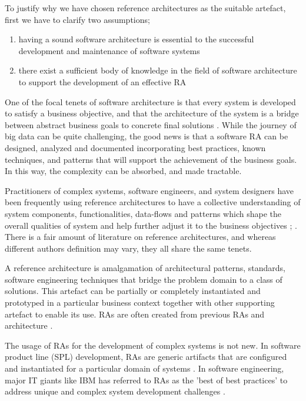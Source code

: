 \documentclass[review]{elsarticle}
\begin{document}
To justify why we have chosen reference architectures as the suitable artefact, first we have to clarify two assumptions; 

\begin{enumerate}
    \item having a sound software architecture is essential to the successful development and maintenance of software systems
    \item there exist a sufficient body of knowledge in the field of software architecture to support the development of an effective RA 
\end{enumerate}

One of the focal tenets of software architecture is that every system is developed to satisfy a business objective, and that the architecture of the system is a bridge between abstract business goals to concrete final solutions \cite{SoftwareArchitectureKazman}. While the journey of big data can be quite challenging, the good news is that a software RA can be designed, analyzed and documented incorporating best practices, known techniques, and patterns that will support the achievement of the business goals. In this way, the complexity can be absorbed, and made tractable.  

Practitioners of complex systems, software engineers, and system designers have been frequently using reference architectures to have a collective understanding of system components, functionalities, data-flows and patterns which shape the overall qualities of system and help further adjust it to the business objectives \cite{Cloutier}; \cite{kohler2019towards}. There is a fair amount of literature on reference architectures, and whereas different authors definition may vary, they all share the same tenets. 

A reference architecture is amalgamation of architectural patterns, standards, software engineering techniques that bridge the problem domain to a class of solutions. This artefact can be partially or completely instantiated and prototyped in a particular business context together with other supporting artefact to enable its use. RAs are often created from previous RAs and architecture \cite{AtaeiACIS}.

The usage of RAs for the development of complex systems is not new. In software product line (SPL) development, RAs are generic artifacts that are configured and instantiated for a particular domain of systems \cite{Derras}. In software engineering, major IT giants like IBM has referred to RAs as the 'best of best practices' to address unique and complex system development challenges \cite{Cloutier}. 
\end{document}
